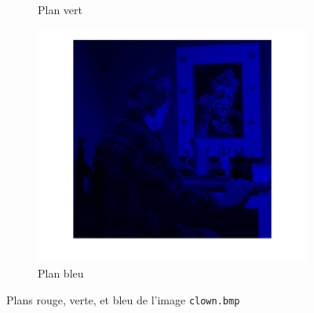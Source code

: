 \documentclass[a4paper]{article}
\begin{document}
\begin{figure}[H]
\begin{subfigure}[c]{0.3\textwidth}
        \caption{Plan vert} 
        \label{subfig:IV}
    \end{subfigure}
    \begin{subfigure}[c]{0.3\textwidth}
        \centering
        \includegraphics[width=\textwidth]{images/B.png}
        \caption{Plan bleu} 
        \label{subfig:B}
    \end{subfigure}
    \caption{Plans rouge, verte, et bleu de l'image \texttt{clown.bmp}}
    \label{fig:plans}
\end{figure}
\end{document}
